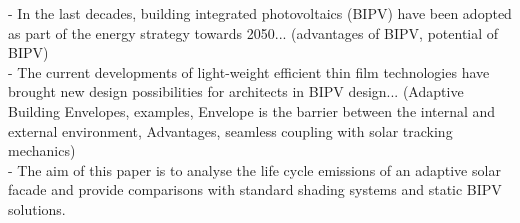
- In the last decades, building integrated photovoltaics (BIPV) have been adopted as part of the energy strategy towards 2050... (advantages of BIPV, potential of BIPV)\\

- The current developments of light-weight efficient thin film technologies have brought new design possibilities for architects in BIPV design... (Adaptive Building Envelopes, examples, Envelope is the barrier between the internal and external environment, Advantages, seamless coupling with solar tracking mechanics) \\

- The aim of this paper is to analyse the life cycle emissions of an adaptive solar facade and provide comparisons with standard shading systems and static BIPV solutions.\\
